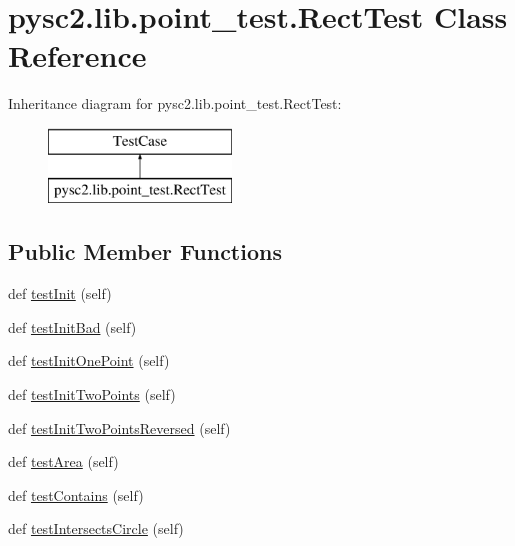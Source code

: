 \hypertarget{classpysc2_1_1lib_1_1point__test_1_1_rect_test}{}\section{pysc2.\+lib.\+point\+\_\+test.\+Rect\+Test Class Reference}
\label{classpysc2_1_1lib_1_1point__test_1_1_rect_test}
Inheritance diagram for pysc2.\+lib.\+point\+\_\+test.\+Rect\+Test\+:\begin{figure}[H]
\begin{center}
\leavevmode
\includegraphics[height=2.000000cm]{classpysc2_1_1lib_1_1point__test_1_1_rect_test}
\end{center}
\end{figure}
\subsection*{Public Member Functions}
\begin{DoxyCompactItemize}
\item 
def \mbox{\hyperlink{classpysc2_1_1lib_1_1point__test_1_1_rect_test_a893ea1a07df964e737f34350d0d9c9e1}{test\+Init}} (self)
\item 
def \mbox{\hyperlink{classpysc2_1_1lib_1_1point__test_1_1_rect_test_a0aba50946172b2be4f7132c35717e0ac}{test\+Init\+Bad}} (self)
\item 
def \mbox{\hyperlink{classpysc2_1_1lib_1_1point__test_1_1_rect_test_a49ea48bb22c49707212243ebd03ce7e6}{test\+Init\+One\+Point}} (self)
\item 
def \mbox{\hyperlink{classpysc2_1_1lib_1_1point__test_1_1_rect_test_ab9a05e0bcf244c014345d6d9b7436d09}{test\+Init\+Two\+Points}} (self)
\item 
def \mbox{\hyperlink{classpysc2_1_1lib_1_1point__test_1_1_rect_test_ae98ee95a8e5ce8f489ba137baeb0ec2b}{test\+Init\+Two\+Points\+Reversed}} (self)
\item 
def \mbox{\hyperlink{classpysc2_1_1lib_1_1point__test_1_1_rect_test_a4c21de209a3a55328d9e18e395a4dc60}{test\+Area}} (self)
\item 
def \mbox{\hyperlink{classpysc2_1_1lib_1_1point__test_1_1_rect_test_a80deb542f38aab65a18e3cc76c7ece1d}{test\+Contains}} (self)
\item 
def \mbox{\hyperlink{classpysc2_1_1lib_1_1point__test_1_1_rect_test_a7238871e6257d01a82844ac7bac60eac}{test\+Intersects\+Circle}} (self)
\end{DoxyCompactItemize}


